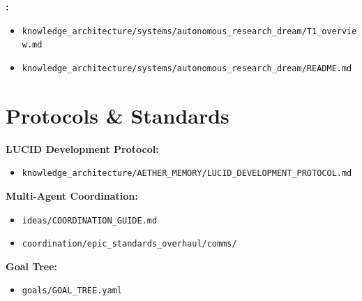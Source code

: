 \textbf{\ard:}
\begin{itemize}
    \item \texttt{knowledge\_architecture/systems/autonomous\_research\_dream/T1\_overview.md}
    \item \texttt{knowledge\_architecture/systems/autonomous\_research\_dream/README.md}
\end{itemize}

\section*{Protocols \& Standards}

\textbf{LUCID Development Protocol:}
\begin{itemize}
    \item \texttt{knowledge\_architecture/AETHER\_MEMORY/LUCID\_DEVELOPMENT\_PROTOCOL.md}
\end{itemize}

\textbf{Multi-Agent Coordination:}
\begin{itemize}
    \item \texttt{ideas/COORDINATION\_GUIDE.md}
    \item \texttt{coordination/epic\_standards\_overhaul/comms/}
\end{itemize}

\textbf{Goal Tree:}
\begin{itemize}
    \item \texttt{goals/GOAL\_TREE.yaml}
\end{itemize}

